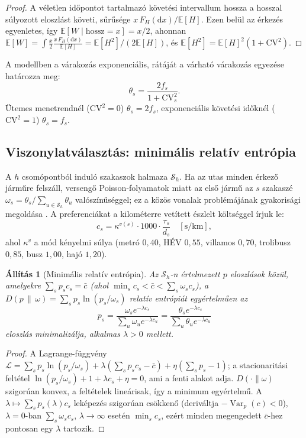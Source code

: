 \documentclass[12pt,a4paper]{article}
\newtheorem{allitas}[tetel]{Állítás}
\theoremstyle{definition}
\theoremstyle{remark}
\newcommand{\E}{\mathbb{E}}
\newcommand{\Var}{\operatorname{Var}}
\newcommand{\Ss}{\mathcal{S}}
\begin{document}
\begin{proof}
A véletlen időpontot tartalmazó követési intervallum hossza a hosszal
súlyozott eloszlást követi, sűrűsége $x\,F_H(\mathrm dx)/\E[H]$. Ezen belül
az érkezés egyenletes, így $\E[W\mid\text{hossz}=x]=x/2$, ahonnan
$\E[W]=\int\frac{x}{2}\frac{x\,F_H(\mathrm dx)}{\E[H]}=\E[H^2]/(2\E[H])$, és
$\E[H^2]=\E[H]^2(1+\mathrm{CV}^2)$.
\end{proof}

A modellben a várakozás exponenciális, rátáját a várható várakozás
egyezése határozza meg:
\begin{equation}
  \theta_s=\frac{2f_s}{1+\mathrm{CV}^2_s}.
  \label{eq:theta}
\end{equation}
Ütemes menetrendnél ($\mathrm{CV}^2=0$) $\theta_s=2f_s$, exponenciális
követési időknél ($\mathrm{CV}^2=1$) $\theta_s=f_s$.

\subsection{Viszonylatválasztás: minimális relatív entrópia}

A $h$ csomópontból induló szakaszok halmaza $\Ss_h$. Ha az utas minden
érkező járműre felszáll, versengő Poisson-folyamatok miatt az első jármű az
$s$ szakaszé $\omega_s=\theta_s/\sum_{u\in\Ss_h}\theta_u$ valószínűséggel; ez
a közös vonalak problémájának gyakorisági megoldása \citep{chriqui1975}. A
preferenciákat a kilométerre vetített észlelt költséggel írjuk le:
\begin{equation}
  c_s=\kappa^{v(s)}\cdot 1000\cdot\frac{\tau_s}{d_s}\quad[\mathrm{s}/\mathrm{km}],
\end{equation}
ahol $\kappa^v$ a mód kényelmi súlya (metró $0{,}40$, HÉV $0{,}55$,
villamos $0{,}70$, trolibusz $0{,}85$, busz $1{,}00$, hajó $1{,}20$).

\begin{allitas}[Minimális relatív entrópia]
\label{all:minent}
Az $\Ss_h$-n értelmezett $p$ eloszlások közül, amelyekre
$\sum_sp_sc_s=\bar c$ (ahol $\min_sc_s<\bar c<\sum_s\omega_sc_s$), a
$D(p\,\|\,\omega)=\sum_sp_s\ln(p_s/\omega_s)$ relatív entrópiát egyértelműen az
\[
  p_s=\frac{\omega_se^{-\lambda c_s}}{\sum_u\omega_ue^{-\lambda c_u}}
     =\frac{\theta_se^{-\lambda c_s}}{\sum_u\theta_ue^{-\lambda c_u}}
\]
eloszlás minimalizálja, alkalmas $\lambda>0$ mellett.
\end{allitas}

\begin{proof}
A Lagrange-függvény
$\mathcal L=\sum_sp_s\ln(p_s/\omega_s)+\lambda(\sum_sp_sc_s-\bar c)+\eta(\sum_sp_s-1)$;
a stacionaritási feltétel $\ln(p_s/\omega_s)+1+\lambda c_s+\eta=0$, ami a
fenti alakot adja. $D(\cdot\|\omega)$ szigorúan konvex, a feltételek
lineárisak, így a minimum egyértelmű. A $\lambda\mapsto\sum_sp_s(\lambda)c_s$
leképezés szigorúan csökkenő (deriváltja $-\Var_p(c)<0$), $\lambda=0$-ban
$\sum_s\omega_sc_s$, $\lambda\to\infty$ esetén $\min_sc_s$, ezért minden
megengedett $\bar c$-hez pontosan egy $\lambda$ tartozik.
\end{proof}
\end{document}
